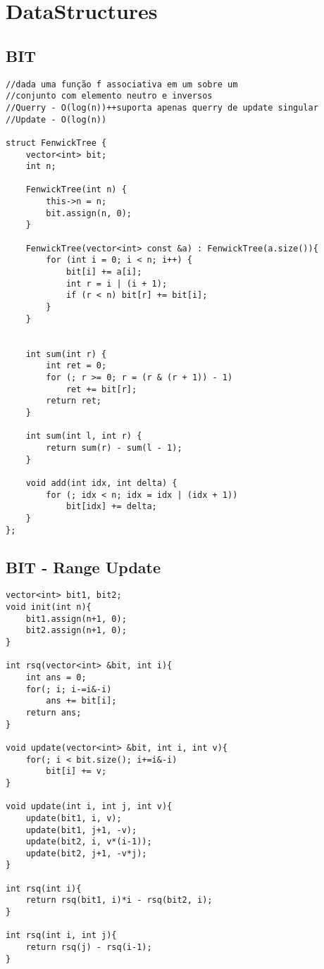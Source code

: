 \documentclass[11pt, a4paper, twoside]{article}
\begin{document}
%
%

\section{DataStructures}

\subsection{BIT}
\begin{verbatim}
//dada uma função f associativa em um sobre um
//conjunto com elemento neutro e inversos
//Querry - O(log(n))++suporta apenas querry de update singular
//Update - O(log(n))

struct FenwickTree {
    vector<int> bit; 
    int n;
    
    FenwickTree(int n) {
        this->n = n;
        bit.assign(n, 0);
    }
    
    FenwickTree(vector<int> const &a) : FenwickTree(a.size()){
        for (int i = 0; i < n; i++) {
            bit[i] += a[i];
            int r = i | (i + 1);
            if (r < n) bit[r] += bit[i];
        }
    }
    
    
    int sum(int r) {
        int ret = 0;
        for (; r >= 0; r = (r & (r + 1)) - 1)
            ret += bit[r];
        return ret;
    }
    
    int sum(int l, int r) {
        return sum(r) - sum(l - 1);
    }
    
    void add(int idx, int delta) {
        for (; idx < n; idx = idx | (idx + 1))
            bit[idx] += delta;
    }
};
\end{verbatim}

\subsection{BIT - Range Update}
\begin{verbatim}
vector<int> bit1, bit2;
void init(int n){
	bit1.assign(n+1, 0);
	bit2.assign(n+1, 0);
}

int rsq(vector<int> &bit, int i){
	int ans = 0;
	for(; i; i-=i&-i)
		ans += bit[i];
	return ans;
}

void update(vector<int> &bit, int i, int v){
	for(; i < bit.size(); i+=i&-i)
		bit[i] += v;
}

void update(int i, int j, int v){
	update(bit1, i, v);
	update(bit1, j+1, -v);
	update(bit2, i, v*(i-1));
	update(bit2, j+1, -v*j);	
}

int rsq(int i){
	return rsq(bit1, i)*i - rsq(bit2, i);
}

int rsq(int i, int j){
	return rsq(j) - rsq(i-1);
}
\end{verbatim}
\end{document}
